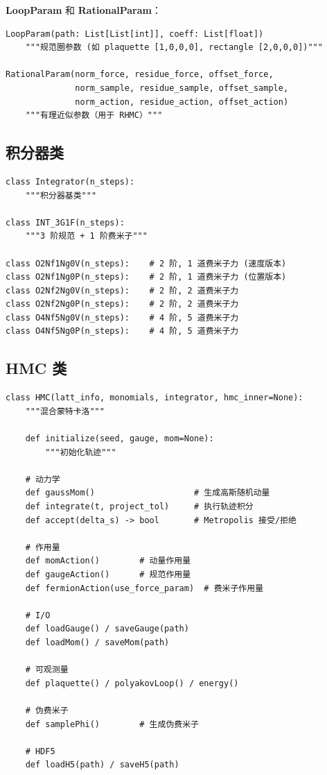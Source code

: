 \documentclass[12pt,a4paper]{ctexart}
\begin{document}
\textbf{LoopParam} 和 \textbf{RationalParam}：
\begin{lstlisting}[style=pycode]
LoopParam(path: List[List[int]], coeff: List[float])
    """规范圈参数 (如 plaquette [1,0,0,0], rectangle [2,0,0,0])"""

RationalParam(norm_force, residue_force, offset_force,
              norm_sample, residue_sample, offset_sample,
              norm_action, residue_action, offset_action)
    """有理近似参数（用于 RHMC）"""
\end{lstlisting}

\subsection{积分器类}

\begin{lstlisting}[style=pycode]
class Integrator(n_steps):
    """积分器基类"""

class INT_3G1F(n_steps):
    """3 阶规范 + 1 阶费米子"""

class O2Nf1Ng0V(n_steps):    # 2 阶, 1 道费米子力 (速度版本)
class O2Nf1Ng0P(n_steps):    # 2 阶, 1 道费米子力 (位置版本)
class O2Nf2Ng0V(n_steps):    # 2 阶, 2 道费米子力
class O2Nf2Ng0P(n_steps):    # 2 阶, 2 道费米子力
class O4Nf5Ng0V(n_steps):    # 4 阶, 5 道费米子力
class O4Nf5Ng0P(n_steps):    # 4 阶, 5 道费米子力
\end{lstlisting}

\subsection{HMC 类}

\begin{lstlisting}[style=pycode]
class HMC(latt_info, monomials, integrator, hmc_inner=None):
    """混合蒙特卡洛"""

    def initialize(seed, gauge, mom=None):
        """初始化轨迹"""

    # 动力学
    def gaussMom()                    # 生成高斯随机动量
    def integrate(t, project_tol)     # 执行轨迹积分
    def accept(delta_s) -> bool       # Metropolis 接受/拒绝

    # 作用量
    def momAction()        # 动量作用量
    def gaugeAction()      # 规范作用量
    def fermionAction(use_force_param)  # 费米子作用量

    # I/O
    def loadGauge() / saveGauge(path)
    def loadMom() / saveMom(path)

    # 可观测量
    def plaquette() / polyakovLoop() / energy()

    # 伪费米子
    def samplePhi()        # 生成伪费米子

    # HDF5
    def loadH5(path) / saveH5(path)
\end{lstlisting}
\end{document}
